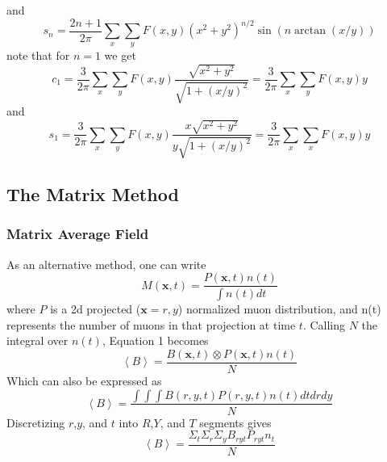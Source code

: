 \documentclass[twoside]{article}
\begin{document}
and
\begin{equation}
s_n = \frac{2n+1}{2\pi} \sum_{x}  \sum_{y} 
F(x,y) (x^2 + y^2)^{n/2} \sin(n \arctan(x/y))
\end{equation}
note that for $n=1$ we get
\begin{equation}
c_1 = \frac{3}{2\pi} \sum_{x}  \sum_{y} 
F(x,y)  \frac{\sqrt{x^2 + y^2}}{\sqrt{1 + (x/y)^2 }} = 
\frac{3}{2\pi} \sum_{x}  \sum_{y} 
F(x,y) y
\end{equation}
and
\begin{equation}
s_1 = \frac{3}{2\pi} \sum_{x}  \sum_{y} 
F(x,y)  \frac{x \sqrt{x^2 + y^2}}{y \sqrt{1 + (x/y)^2 }} = 
\frac{3}{2\pi} \sum_{x}  \sum_{x} 
F(x,y) y
\end{equation}





\subsection{The Matrix Method}
\subsubsection{Matrix Average Field}
As an alternative method, one can write 
\begin{equation}
M(\textbf{x},t) = \frac{P(\textbf{x},t)n(t)}{\int n(t) dt} 
\end{equation}
where $P$ is a 2d projected ($\textbf{x}=r,y$) normalized muon distribution, and n(t) represents the number of muons in that projection at time $t$. Calling $N$ the integral over $n(t)$,  Equation 1 becomes
\begin{equation}
\left\langle B \right\rangle = \frac{B(\textbf{x},t) \otimes P(\textbf{x},t)n(t)}{N}
\end{equation}
Which can also be expressed as 
\begin{equation}
\left\langle B \right\rangle = \frac{\int \int \int  B(r,y,t) P(r,y,t)n(t)dtdrdy  }  {N}
\end{equation}
Discretizing $r$,$y$, and $t$ into $R$,$Y$, and $T$ segments gives
\begin{equation}
\label{dis}
\boxed{
\left\langle B \right\rangle = \frac{\Sigma_t \Sigma_r \Sigma_y    B_{ryt} P_{ryt}n_t }  {N}
}
\end{equation}
\end{document}
